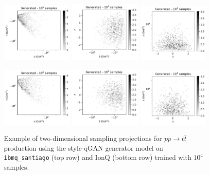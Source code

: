 \documentclass[twocolumn,preprintnumbers,superscriptaddress]{revtex4-2}
\begin{document}
\begin{figure}
  \includegraphics[width=0.32\textwidth]{plots/hardware/ibm_santiago/s-t_FAKE_IBM_1k.pdf}%
  \includegraphics[width=0.32\textwidth]{plots/hardware/ibm_santiago/t-y_FAKE_IBM_1k.pdf}%
  \includegraphics[width=0.32\textwidth]{plots/hardware/ibm_santiago/y-s_FAKE_IBM_1k.pdf}

  \includegraphics[width=0.32\textwidth]{plots/hardware/ionQ/s-t_FAKE_ionQ_1k.pdf}%
  \includegraphics[width=0.32\textwidth]{plots/hardware/ionQ/t-y_FAKE_ionQ_1k.pdf}%
  \includegraphics[width=0.32\textwidth]{plots/hardware/ionQ/y-s_FAKE_ionQ_1k.pdf}

  \caption{\label{fig:ionq}Example of two-dimensional sampling projections for
  $pp \rightarrow t\bar{t}$ production using the style-qGAN generator
  model on {\tt ibmq\_santiago} (top row) and IonQ (bottom row) trained with $10^4$ samples.}
\end{figure}
\end{document}
